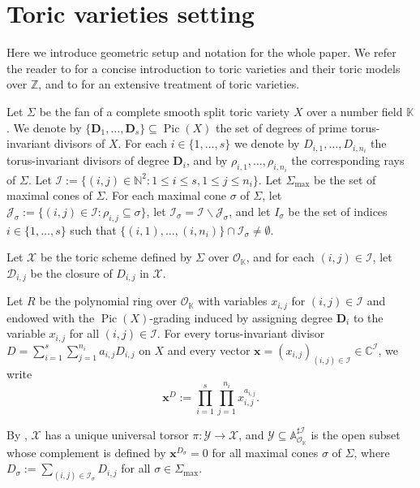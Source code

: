 \documentclass[10pt, a4paper, reqno, english]{amsart}
\newcommand\NN{\mathbb{N}}
\newcommand\CC{\mathbb{C}}
\newcommand{\KK}{\mathbb{K}} %
\newcommand{\A}{\mathbb{A}} %
\newcommand{\OO}{\mathcal{O}} %
\newcommand{\ii}[1]{\mathcal{J}_{#1}} %
\newcommand{\ic}[1]{\mathcal{I}_{#1}} %
\newcommand{\indexset}{{\mathcal I}} %
\newcommand{\divclass}{{\mathbf D}} %
\DeclareMathOperator{\pic}{Pic} %
\theoremstyle{definition}
\numberwithin{theorem}{section}
\numberwithin{equation}{section}
\begin{document}
\section{Toric varieties setting}
\label{sec:toricsetting}
Here we introduce geometric setup and notation for the whole paper.
We refer the reader to \cite[\S8]{MR1679841} for a concise introduction to toric varieties and their toric models over $\mathbb Z$, and to \cite{MR2810322} for an extensive treatment of toric varieties.

Let $\Sigma$ be the fan of a complete smooth split toric variety $X$ over a number field $\KK$. We denote by $\{\divclass_1,\dots,\divclass_s\}\subseteq\pic(X)$ the set of degrees of prime torus-invariant divisors of $X$. For each $i\in\{1,\dots,s\}$ we denote by $D_{i,1},\dots,D_{i,n_i}$ the torus-invariant divisors of degree $\divclass_i$, and by $\rho_{i,1},\dots,\rho_{i,n_i}$ the corresponding rays of $\Sigma$.	
Let $\indexset:=\{(i,j)\in\NN^2:1\leq i\leq s, 1\leq j\leq n_i\}$.
Let $\Sigma_{\max}$ be the set of maximal cones of $\Sigma$.
For each maximal cone $\sigma$ of $\Sigma$, let $\ii{\sigma}:=\{(i,j)\in \indexset:\rho_{i,j}\subseteq\sigma\}$, let $\ic{\sigma}=\indexset\smallsetminus\ii{\sigma}$, 
and let $I_\sigma$ be the set of indices $i\in\{1,\dots,s\}$ such that $\{(i,1),\dots,(i,n_{i})\}\cap\ic{\sigma}\neq\emptyset$.



Let $\mathscr X$ be the toric scheme defined by $\Sigma$ over $\OO_{\KK}$, and for each $(i,j)\in\indexset$, let $\mathscr D_{i,j}$ be the closure of $D_{i,j}$ in $\mathscr X$.
	
Let $R$ be the polynomial ring over $\OO_{\KK}$ with variables $x_{i,j}$ for $(i,j)\in\indexset$ and endowed with the $\pic(X)$-grading induced by assigning degree $\divclass_i$ to the variable $x_{i,j}$ for all $(i,j)\in\indexset$. 
For every torus-invariant divisor $D=\sum_{i=1}^s\sum_{j=1}^{n_i} a_{i,j} D_{i,j}$ on $X$ and every vector $\mathbf x=(x_{i,j})_{(i,j)\in\indexset}\in \CC^{\indexset}$, we write \[\mathbf x^D:=\prod_{i=1}^s\prod_{j=1}^{n_i}x_{i,j}^{a_{i,j}}.\]
	
	By \cite[\S8]{MR1679841}, $\mathscr X$ has a unique universal torsor $\pi:\mathscr Y\to\mathscr X$, and 
	 $\mathscr Y\subseteq\A^{\sharp \indexset}_{\OO_{\KK}}$ is the open subset whose complement is defined by $\mathbf x^{D_\sigma}=0$ for all 
	maximal cones $\sigma$ of $\Sigma$, where 
	$
	D_\sigma:=\sum_{(i,j)\in\ic{\sigma}}D_{i,j}
	$ 
	for all $\sigma\in\Sigma_{\max}$.
	
\end{document}
